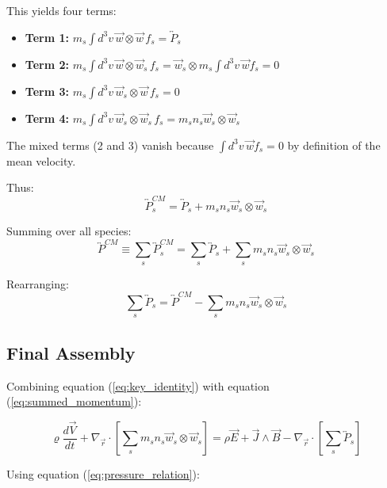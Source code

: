 This yields four terms:
\begin{itemize}
\item \textbf{Term 1:} $\displaystyle m_s \int d^3v \, \vec{w} \otimes \vec{w} \, f_s = \overleftrightarrow{P}_s$
\item \textbf{Term 2:} $\displaystyle m_s \int d^3v \, \vec{w} \otimes \vec{w}_s \, f_s = \vec{w}_s \otimes m_s \int d^3v \, \vec{w} f_s = 0$
\item \textbf{Term 3:} $\displaystyle m_s \int d^3v \, \vec{w}_s \otimes \vec{w} \, f_s = 0$
\item \textbf{Term 4:} $\displaystyle m_s \int d^3v \, \vec{w}_s \otimes \vec{w}_s \, f_s = m_s n_s \vec{w}_s \otimes \vec{w}_s$
\end{itemize}

The mixed terms (2 and 3) vanish because $\int d^3v \, \vec{w} f_s = 0$ by definition of the mean velocity.

Thus:
\begin{equation*}
\overleftrightarrow{P}_s^{CM} = \overleftrightarrow{P}_s + m_s n_s \vec{w}_s \otimes \vec{w}_s
\end{equation*}

Summing over all species:
\begin{equation}
\overleftrightarrow{P}^{CM} \equiv \sum_s \overleftrightarrow{P}_s^{CM} = \sum_s \overleftrightarrow{P}_s + \sum_s m_s n_s \vec{w}_s \otimes \vec{w}_s
\label{eq:pressure_relation}
\end{equation}

Rearranging:
\begin{equation*}
\sum_s \overleftrightarrow{P}_s = \overleftrightarrow{P}^{CM} - \sum_s m_s n_s \vec{w}_s \otimes \vec{w}_s
\end{equation*}

\subsection{Final Assembly}

Combining equation (\ref{eq:key_identity}) with equation (\ref{eq:summed_momentum}):

\begin{equation*}
\varrho \frac{d\vec{V}}{dt} + \nabla_{\vec{r}} \cdot \left[\sum_s m_s n_s \vec{w}_s \otimes \vec{w}_s\right] = \rho \vec{E} + \vec{J} \wedge \vec{B} - \nabla_{\vec{r}} \cdot \left[\sum_s \overleftrightarrow{P}_s\right]
\end{equation*}

Using equation (\ref{eq:pressure_relation}):

